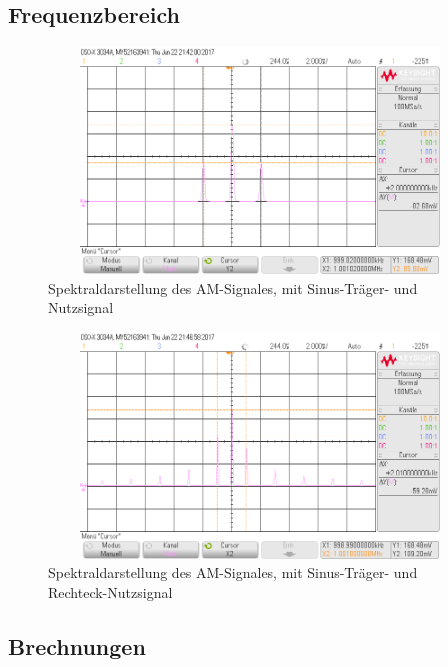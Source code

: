 \subsection{Frequenzbereich}

\begin{figure}[H]
 \begin{center}
  \includegraphics[height=6cm,width=12cm]{OsziBilder/bsp3_sin_rms_allCursor}
 \end{center}
 \caption{Spektraldarstellung des AM-Signales, mit Sinus-Träger- und Nutzsignal}
\end{figure}

\begin{figure}[H]
 \begin{center}
  \includegraphics[height=6cm,width=12cm]{OsziBilder/bsp3_am_rect_rms_cursor}
 \end{center}
 \caption{Spektraldarstellung des AM-Signales, mit Sinus-Träger- und Rechteck-Nutzsignal}
\end{figure}

\subsection{Brechnungen}

